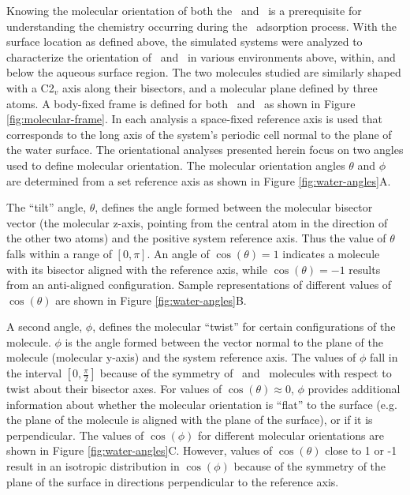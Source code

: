Knowing the molecular orientation of both the \wat~and \suldiox~is a prerequisite for understanding the chemistry occurring during the \suldiox~adsorption process. With the surface location as defined above, the simulated systems were analyzed to characterize the orientation of \wat~and \suldiox~in various environments above, within, and below the aqueous surface region. The two molecules studied are similarly shaped with a C2$_v$ axis along their bisectors, and a molecular plane defined by three atoms. A body-fixed frame is defined for both \wat~and \suldiox~as shown in Figure \ref{fig:molecular-frame}. In each analysis a space-fixed reference axis is used that corresponds to the long axis of the system's periodic cell normal to the plane of the water surface. The orientational analyses presented herein focus on two angles used to define molecular orientation. The molecular orientation angles $\theta$ and $\phi$ are determined from a set reference axis as shown in Figure \ref{fig:water-angles}A.
	
	The ``tilt'' angle, $\theta$, defines the angle formed between the molecular bisector vector (the molecular z-axis, pointing from the central atom in the direction of the other two atoms) and the positive system reference axis. Thus the value of $\theta$ falls within a range of $[0,\pi]$. An angle of $\cos(\theta)=1$ indicates a molecule with its bisector aligned with the reference axis, while $\cos(\theta)=-1$ results from an anti-aligned configuration. Sample representations of different values of $\cos(\theta)$ are shown in Figure \ref{fig:water-angles}B.
	
	A second angle, $\phi$, defines the molecular ``twist'' for certain configurations of the molecule. $\phi$ is the angle formed between the vector normal to the plane of the molecule (molecular y-axis) and the system reference axis. The values of $\phi$ fall in the interval $[0,\frac{\pi}{2}]$ because of the symmetry of \wat~and \suldiox~molecules with respect to twist about their bisector axes. For values of $\cos(\theta) \approx 0$, $\phi$ provides additional information about whether the molecular orientation is ``flat'' to the surface (e.g. the plane of the molecule is aligned with the plane of the surface), or if it is perpendicular. The values of $\cos(\phi)$ for different molecular orientations are shown in Figure \ref{fig:water-angles}C. %
	However, values of $\cos(\theta)$ close to 1 or -1 result in an isotropic distribution in $\cos(\phi)$ because of the symmetry of the plane of the surface in directions perpendicular to the reference axis.

